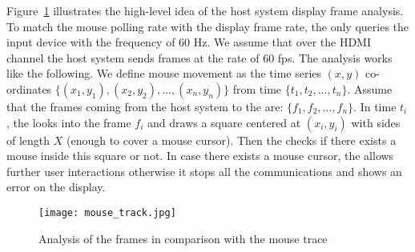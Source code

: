 Figure~\ref{fig:overallIdea} illustrates the high-level idea of the host system display frame analysis. To match the mouse polling rate with the display frame rate, the \device only queries the input device with the frequency of $60$ Hz. We assume that over the HDMI channel the host system sends frames at the rate of $60$ fps. The analysis works like the following. We define mouse movement as the time series $(x,y)$ co-ordinates $\{(x_1,y_1), (x_2, y_2), \ldots, (x_n,y_n)\}$ from time $\{t_1, t_2, \ldots, t_n\}$. Assume that the frames coming from the host system to the \device are: $\{f_1, f_2, \ldots, f_n\}$. In time $t_i$, the \device looks into the frame $f_i$ and draws a square centered at $(x_i, y_i)$ with sides of length $X$ (enough to cover a mouse cursor). Then the \device checks if there exists a mouse inside this square or not. In case there exists a mouse cursor, the \device allows further user interactions otherwise it stops all the communications and shows an error on the display.


\begin{figure}
\centering
\texttt{[image: mouse\_track.jpg]}
\caption{Analysis of the frames in comparison with the mouse trace}
\label{fig:overallIdea}
\centering
\end{figure}

